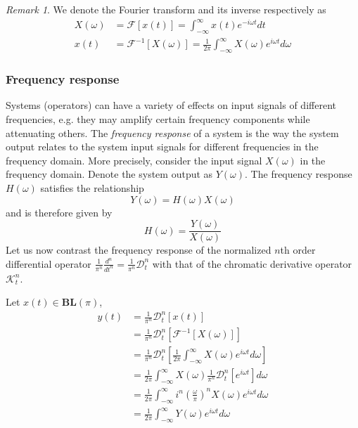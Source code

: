 \documentclass[11pt]{article} %
\theoremstyle{plain}
\theoremstyle{definition}
\theoremstyle{remark}
\newtheorem*{remark}{Remark}
\begin{document}
\begin{remark}
We denote the Fourier transform and its inverse respectively as 
\begin{align}
  X(\omega) &= \mathcal{F}[x(t)] = \int_{-\infty}^{\infty} x(t) e^{-i \omega t} dt \\
  x(t)      &= \mathcal{F}^{-1}[X(\omega)] = \frac{1}{2 \pi} \int_{-\infty}^{\infty} X(\omega) e^{i \omega t} d\omega
\end{align}
\end{remark}

\subsubsection{Frequency response}

Systems (operators) can have a variety of effects on input signals of different frequencies, 
e.g. they may amplify certain frequency components while attenuating others. The \emph{frequency 
response} of a system is the way the system output relates to the system input signals for 
different frequencies in the frequency domain. More precisely, consider the input signal $X(\omega)$
in the frequency domain. Denote the system output as $Y(\omega)$. The frequency response $H(\omega)$ 
satisfies the relationship
\begin{equation}
  Y(\omega) = H(\omega) X(\omega)
\end{equation}
and is therefore given by
\begin{equation}
  H(\omega) = \frac{Y(\omega)}{X(\omega)}
\end{equation}
Let us now contrast the frequency response of the normalized $n$th order differential 
operator $\frac{1}{\pi^n} \frac{d^n}{dt^n} = \frac{1}{\pi^n} \mathcal{D}_t^n$ with that 
of the chromatic derivative operator $\mathcal{K}_t^n$.

Let $x(t) \in \mathbf{BL}(\pi)$,
\begin{align*}
  y(t) &= \frac{1}{\pi^n} \mathcal{D}_t^n[x(t)] \\
       &= \frac{1}{\pi^n} \mathcal{D}_t^n[\mathcal{F}^{-1}[X(\omega)]] \\
       &= \frac{1}{\pi^n} \mathcal{D}_t^n \left [ \frac{1}{2 \pi} \int_{-\infty}^{\infty} X(\omega) e^{i \omega t} d\omega \right ] \\
       &= \frac{1}{2 \pi} \int_{-\infty}^{\infty} X(\omega) \frac{1}{\pi^n} \mathcal{D}_t^n[e^{i \omega t}] d\omega \\
       &= \frac{1}{2 \pi} \int_{-\infty}^{\infty} i^n \left(\frac{\omega}{\pi}\right)^n X(\omega) e^{i\omega t} d\omega \\
       &= \frac{1}{2 \pi} \int_{-\infty}^{\infty} Y(\omega) e^{i\omega t} d\omega
\end{align*}
\end{document}
